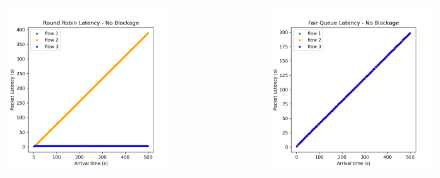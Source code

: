 \documentclass[compress]{beamer}
\begin{document}
\begin{frame}
\begin{columns}
\begin{column}{0.32\textwidth}
\begin{figure}
                    \includegraphics[width=\textwidth]{../img/rr_equal}
                \end{figure}
            \end{column}
            \begin{column}{0.32\textwidth}
                \begin{figure}
                    \centering
                    \includegraphics[width=\textwidth]{../img/fq_equal}
                \end{figure}
            \end{column}
        \end{columns}
    \end{frame}
\end{document}
